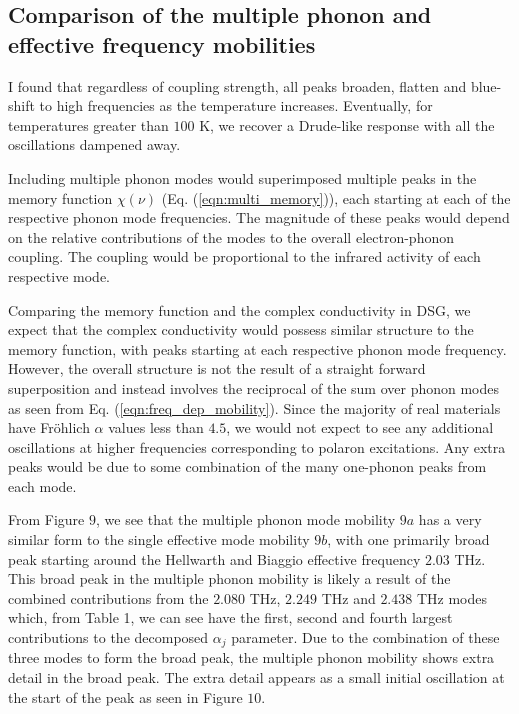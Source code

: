 \subsection{Comparison of the multiple phonon and effective frequency mobilities}

I found that regardless of coupling strength, all peaks broaden, flatten and blue-shift to high frequencies as the temperature increases. Eventually, for temperatures greater than $100$ K, we recover a Drude-like response with all the oscillations dampened away. 

Including multiple phonon modes would superimposed multiple peaks in the memory function $\chi(\nu)$ (Eq. (\ref{eqn:multi_memory})), each starting at each of the respective phonon mode frequencies. The magnitude of these peaks would depend on the relative contributions of the modes to the overall electron-phonon coupling. The coupling would be proportional to the infrared activity of each respective mode. 

Comparing the memory function and the complex conductivity in DSG, we expect that the complex conductivity would possess similar structure to the memory function, with peaks starting at each respective phonon mode frequency. However, the overall structure is not the result of a straight forward superposition and instead involves the reciprocal of the sum over phonon modes as seen from Eq. (\ref{eqn:freq_dep_mobility}). Since the majority of real materials have Fr\"ohlich $\alpha$ values less than $4.5$, we would not expect to see any additional oscillations at higher frequencies corresponding to polaron excitations. Any extra peaks would be due to some combination of the many one-phonon peaks from each mode. 

From Figure $9$, we see that the multiple phonon mode mobility $9a$ has a very similar form to the single effective mode mobility $9b$, with one primarily broad peak starting around the Hellwarth and Biaggio effective frequency $2.03$ THz. This broad peak in the multiple phonon mobility is likely a result of the combined contributions from the $2.080$ THz, $2.249$ THz and $2.438$ THz modes which, from Table 1, we can see have the first, second and fourth largest contributions to the decomposed $\alpha_j$ parameter. Due to the combination of these three modes to form the broad peak, the multiple phonon mobility shows extra detail in the broad peak. The extra detail appears as a small initial oscillation at the start of the peak as seen in Figure $10$. 

